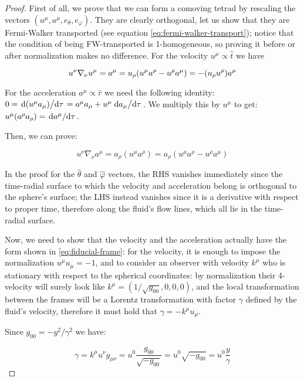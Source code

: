 \documentclass[main.tex]{subfiles}
\begin{document}
\begin{proof}
    First of all, we prove that we can form a comoving tetrad by rescaling the vectors \((u^\mu, a^\mu, e_\theta, e_\varphi)\). They are clearly orthogonal, let us show that they are Fermi-Walker transported (see equation \eqref{eq:fermi-walker-transport}); notice that the condition of being FW-transported is 1-homogeneous, so proving it before or after normalization makes no difference.
    For the velocity \(u^\mu \propto \hat{t}\)  we have

    \begin{equation}
        u^\nu \nabla_\nu u^\mu = a^\mu = u_\rho \qty(u^\mu a^\rho - u^\rho a^\mu) = - (u_\rho u^\rho) a^\mu
    \end{equation}

    For the acceleration \(a^\mu \propto \hat{r} \) we need the following identity: \(0=\dv*{(u^\mu a_\mu)}{\tau} =a^\mu a_\mu + u^\mu \dv*{a_\mu}{\tau} \). We multiply this by \(u^\mu\) to get: \(u^\mu (a^\rho a_\rho) = \dv*{a^\mu}{\tau}\).

    Then, we can prove:

    \begin{equation}
      u^\nu \nabla_\nu a^\mu
      = a_\rho (u^\mu a^\rho)
      = a_\rho (u^\mu a^\rho - u^\rho a^\mu)
    \end{equation}

    In the proof for the \(\hat{\theta} \) and \(\hat\varphi\) vectors, the RHS vanishes immediately since the time-radial surface to which the velocity and acceleration belong is orthogonal to the sphere's surface; the LHS instead vanishes since it is a derivative with respect to proper time, therefore along the fluid's flow lines, which all lie in the time-radial surface.

    Now, we need to show that the velocity and the acceleration actually have the form shown in \eqref{eq:fiducial-frame}: for the velocity, it is enough to impose the normalization \(u^\mu u_\mu = -1 \), and to consider an observer with velocity  \(k^\mu\) who is stationary with respect to the spherical coordinates: by normalization their 4-velocity will surely look like \(k^\mu = (1/\sqrt{g_{00}}, 0,0,0)\), and the local transformation between the frames will be a Lorentz transformation with factor \(\gamma\) defined by the fluid's velocity, therefore it must hold that \(\gamma = - k^\mu u_\mu\).

    Since \(g_{00} = - y^2 / \gamma^2\) we have:

    \begin{equation}
      \gamma = k^\mu u^\nu g_{\mu\nu} = u^0 \frac{g_{00}}{\sqrt{-g_{00}} }
      = u^0 \sqrt{-g_{00}} = u^0 \frac{y}{\gamma}
    \end{equation}


\end{proof}
\end{document}
